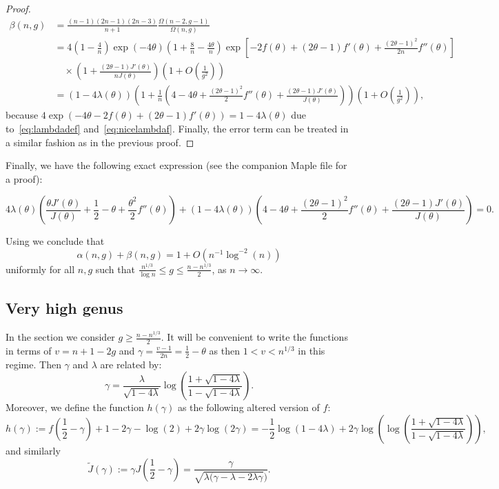 \documentclass[a4paper,12pt]{article}
\theoremstyle{definition}
\newcommand{\bigO}[1]{O\left({#1}\right)}
\newcommand{\err}{\bigO{n^{-1}\log^{-2}(n)}}
\newcommand{\bigpar}[1]{\left({#1}\right)}
\begin{document}
\begin{proof}
\begin{align*}
\beta(n,g)
    &=\frac{(n-1)(2n-1)(2n-3)}{n+1}\frac{\Omega(n-2,g-1)}{\Omega(n,g)}\\
    &=4\left(1-\frac{4}{n}\right)\exp(-4\theta)\left(1+\frac{8}{n}-\frac{4\theta}{n}\right)\exp\left[-2f(\theta)+(2\theta-1)f'(\theta)+\frac{(2\theta-1)^2}{2n}f''(\theta)\right]\\
    &\quad\times\left(1+\frac{(2\theta-1)J'\left(\theta\right)}{nJ\left(\theta\right)}\right)\bigpar{1+\bigO{\frac{1}{g^2}}}\\
    &=(1-4\lambda(\theta))\left(1+\frac{1}{n}\left(4-4\theta+\frac{(2\theta-1)^2}{2}f''(\theta)+\frac{(2\theta-1)J'\left(\theta\right)}{J\left(\theta\right)}\right)\right)\bigpar{1+\bigO{\frac{1}{g^2}}},
\end{align*}
because $4\exp(-4\theta-2f(\theta)+(2\theta-1)f'(\theta))=1-4\lambda(\theta)$ due to~\eqref{eq:lambdadef} and~\eqref{eq:nicelambdaf}.
Finally, the error term can be treated in a similar fashion as in the previous proof.
\end{proof}

Finally, we have the following exact expression (see the companion Maple file for a proof):

   \[ 4\lambda(\theta)\left(\frac{\theta J'\left(\theta\right)}{J\left(\theta\right)}+\frac{1}{2}-{\theta}+\frac{\theta^2}{2}f''(\theta)\right)+(1-4\lambda(\theta))\left(
 4 -4\theta+\frac{(2\theta-1)^2}{2}f''(\theta)+\frac{(2\theta-1)J'\left(\theta\right)}{J\left(\theta\right)}\right)=0.\]

Using  we conclude that
\[\alpha(n,g)+\beta(n,g)=1+\err\]
uniformly for all $n,g$ such that $\frac{n^{1/3}}{\log n} \le g \le \frac{n-n^{1/3}}{2}$, as $n\to\infty$.

\subsection{Very high genus}


In the section we consider $g\geq \frac{n-n^{1/3}}{2}$. It will be convenient to write the functions in terms of $v=n+1-2g$ and $\gamma=\frac{v-1}{2n}=\frac{1}{2}-\theta$ as then $1<v<n^{1/3}$ in this regime. Then $\gamma$ and $\lambda$ are related by:
\[\gamma=\frac{\lambda}{\sqrt{1-4\lambda}}\log\left(\frac{1+\sqrt{1-4\lambda}}{1-\sqrt{1-4\lambda}}\right).\]
Moreover, we define the function $h(\gamma)$ as the following altered version of $f$:
\[h(\gamma):=f\left(\frac{1}{2}-\gamma\right)+1-2\gamma-\log(2)+2\gamma\log(2\gamma)=-\frac{1}{2}\log(1-4\lambda)+2\gamma\log\left(\log\left(\frac{1+\sqrt{1-4\lambda}}{1-\sqrt{1-4\lambda}}\right)\right),\]
and similarly
\[\tilde{J}(\gamma):=\gamma J\left(\frac{1}{2}-\gamma\right)=\frac{\gamma}{\sqrt{\lambda(\gamma-\lambda-2\lambda\gamma})}.\]
\end{document}
